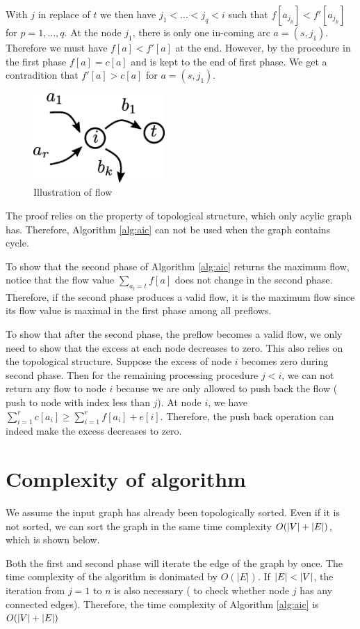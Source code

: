 \documentclass{article}
\DeclarePairedDelimiter\abs{\lvert}{\rvert}
\theoremstyle{definition}
\begin{document}
With $j$ in replace of $t$ we then have $j_1 < \dots < j_q < i$ such that $f[a_{j_p}] < f'[a_{j_p}]$ for $p=1, \dots, q$. 
At the node $j_1$, there is only one in-coming arc $a=(s, j_1)$. Therefore we must have $f[a] < f'[a]$ at the end. However, by the procedure in the first phase $f[a] = c[a]$ and is kept to the end of first phase. We get a contradition that $f'[a] > c[a]$ for $a=(s,j_1)$. 
\begin{figure}[!ht]
\centering
\includegraphics[width=5cm]{maxflow_proof.eps}
\caption{Illustration of flow}\label{maxflow_proof}
\end{figure}

The proof relies on the property of topological structure, which only acylic graph has.  Therefore,  Algorithm \ref{alg:aic} can not be used when the graph contains cycle.

To show that the second phase of Algorithm \ref{alg:aic} returns the maximum flow, notice that the flow value $\sum_{a_t = t} f[a]$ does not change in the second phase. Therefore, if the second phase produces a valid flow, it is the maximum flow since its flow value is maximal in the first phase among all preflows.

To show that after the second phase, the preflow becomes a valid flow, we only need to show that the excess at each node decreases to zero. This also relies on the topological structure. Suppose the excess of node $i$ becomes zero during second phase. Then for the remaining processing procedure $j<i$, we can not return any flow to node $i$ because we are only allowed to push back the flow ( push to node with index less than $j$).  At node $i$, we have $ \sum_{i=1}^r c[a_i] \geq \sum_{i=1}^r f[a_i] + e[i]$. Therefore, the push back operation can indeed make the excess decreases to zero. 
\section{Complexity of algorithm}
We assume the input graph has already been topologically sorted. Even if it is not sorted, we can sort the graph in the same time complexity $O(\abs{V} + \abs{E})$, which is shown below.

Both the first and second phase will iterate the edge of the graph by once. The time complexity of the algorithm is donimated by $O(|E|)$.  If $\abs{E} < \abs{V}$, the iteration from $j=1$ to $n$ is also necessary ( to check whether node $j$ has any connected edges). Therefore, the time complexity of Algorithm \ref{alg:aic} is $O(\abs{V} + \abs{E}) $
\end{document}

